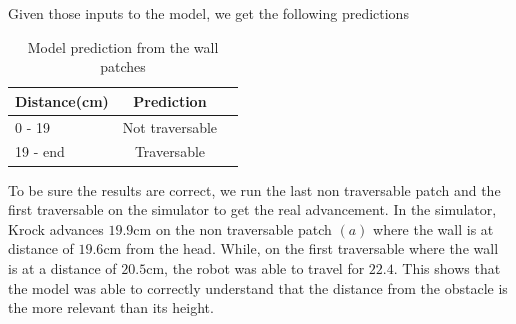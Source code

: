\documentclass[../document.tex]{subfiles}
\begin{document}
Given those inputs to the model, we get the following predictions

\begin{table}[H]
    \centering
    \begin{tabular}{l|cc}
        Distance(cm) & Prediction \\ 
        \hline
        0 - 19  & Not traversable \\ 
        19 - end & Traversable \\ 
        \hline
    \end{tabular}
    \caption{Model prediction from the wall patches}
\end{table}
To be sure the results are correct, we run the last non traversable patch and the first traversable
on the simulator to get the real advancement. In the simulator, Krock advances $19.9$cm on the non traversable patch $(a)$ where the wall is at distance of $19.6$cm from the head. While, on the first traversable where the wall is at a distance of $20.5$cm, the robot was able to travel for $22.4$. This shows that the model was able to correctly understand that the distance from the obstacle is the more relevant than its height.
\end{document}
